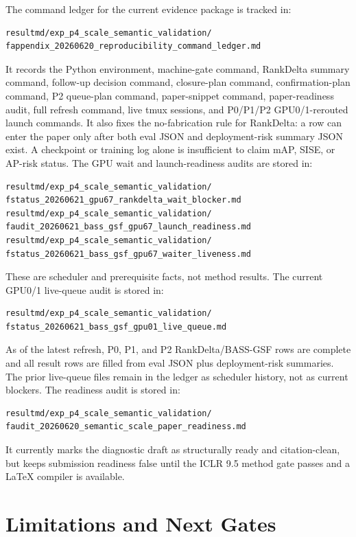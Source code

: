 \documentclass[10pt]{article}
\begin{document}
The command ledger for the current evidence package is tracked in:
\begin{verbatim}
resultmd/exp_p4_scale_semantic_validation/
fappendix_20260620_reproducibility_command_ledger.md
\end{verbatim}
It records the Python environment, machine-gate command, RankDelta summary
command, follow-up decision command, closure-plan command, confirmation-plan command, P2 queue-plan
command, paper-snippet command, paper-readiness audit, full refresh command, live tmux sessions, and P0/P1/P2 GPU0/1-rerouted launch commands.  It also fixes
the no-fabrication rule for RankDelta: a row
can enter the paper only after both eval JSON and deployment-risk summary JSON
exist.  A checkpoint or training log alone is insufficient to claim mAP, SISE,
or AP-risk status.
The GPU wait and launch-readiness audits are stored in:
\begin{verbatim}
resultmd/exp_p4_scale_semantic_validation/
fstatus_20260621_gpu67_rankdelta_wait_blocker.md
resultmd/exp_p4_scale_semantic_validation/
faudit_20260621_bass_gsf_gpu67_launch_readiness.md
resultmd/exp_p4_scale_semantic_validation/
fstatus_20260621_bass_gsf_gpu67_waiter_liveness.md
\end{verbatim}
These are scheduler and prerequisite facts, not method results.
The current GPU0/1 live-queue audit is stored in:
\begin{verbatim}
resultmd/exp_p4_scale_semantic_validation/
fstatus_20260621_bass_gsf_gpu01_live_queue.md
\end{verbatim}
As of the latest refresh, P0, P1, and P2 RankDelta/BASS-GSF rows are complete
and all result rows are filled from eval JSON plus deployment-risk summaries.
The prior live-queue files remain in the ledger as scheduler history, not as
current blockers.
The readiness audit is stored in:
\begin{verbatim}
resultmd/exp_p4_scale_semantic_validation/
faudit_20260620_semantic_scale_paper_readiness.md
\end{verbatim}
It currently marks the diagnostic draft as structurally ready and citation-clean,
but keeps submission readiness false until the ICLR 9.5 method gate passes and
a LaTeX compiler is available.

\section{Limitations and Next Gates}
\end{document}
